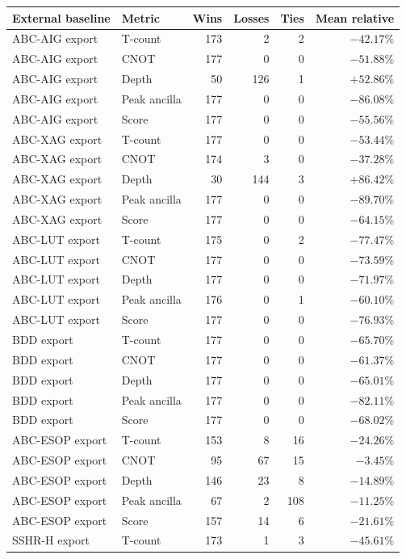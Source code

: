 \begin{tabular}{llrrrr}
\toprule
External baseline & Metric & Wins & Losses & Ties & Mean relative \\
\midrule
ABC-AIG export & T-count & 173 & 2 & 2 & $-42.17\%$ \\
ABC-AIG export & CNOT & 177 & 0 & 0 & $-51.88\%$ \\
ABC-AIG export & Depth & 50 & 126 & 1 & $+52.86\%$ \\
ABC-AIG export & Peak ancilla & 177 & 0 & 0 & $-86.08\%$ \\
ABC-AIG export & Score & 177 & 0 & 0 & $-55.56\%$ \\
ABC-XAG export & T-count & 177 & 0 & 0 & $-53.44\%$ \\
ABC-XAG export & CNOT & 174 & 3 & 0 & $-37.28\%$ \\
ABC-XAG export & Depth & 30 & 144 & 3 & $+86.42\%$ \\
ABC-XAG export & Peak ancilla & 177 & 0 & 0 & $-89.70\%$ \\
ABC-XAG export & Score & 177 & 0 & 0 & $-64.15\%$ \\
ABC-LUT export & T-count & 175 & 0 & 2 & $-77.47\%$ \\
ABC-LUT export & CNOT & 177 & 0 & 0 & $-73.59\%$ \\
ABC-LUT export & Depth & 177 & 0 & 0 & $-71.97\%$ \\
ABC-LUT export & Peak ancilla & 176 & 0 & 1 & $-60.10\%$ \\
ABC-LUT export & Score & 177 & 0 & 0 & $-76.93\%$ \\
BDD export & T-count & 177 & 0 & 0 & $-65.70\%$ \\
BDD export & CNOT & 177 & 0 & 0 & $-61.37\%$ \\
BDD export & Depth & 177 & 0 & 0 & $-65.01\%$ \\
BDD export & Peak ancilla & 177 & 0 & 0 & $-82.11\%$ \\
BDD export & Score & 177 & 0 & 0 & $-68.02\%$ \\
ABC-ESOP export & T-count & 153 & 8 & 16 & $-24.26\%$ \\
ABC-ESOP export & CNOT & 95 & 67 & 15 & $-3.45\%$ \\
ABC-ESOP export & Depth & 146 & 23 & 8 & $-14.89\%$ \\
ABC-ESOP export & Peak ancilla & 67 & 2 & 108 & $-11.25\%$ \\
ABC-ESOP export & Score & 157 & 14 & 6 & $-21.61\%$ \\
SSHR-H export & T-count & 173 & 1 & 3 & $-45.61\%$ \\

\end{tabular}
